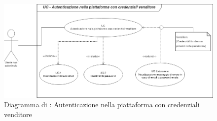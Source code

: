 
\begin{figure}[H]
    \centering
    \includegraphics[scale=0.6]{Immagini/DiagrammiUC/AccessoVenditore.png}
    \caption{Diagramma di \actualUC: Autenticazione nella piattaforma con credenziali venditore} 
    \label{fig:Login}
\end{figure}

